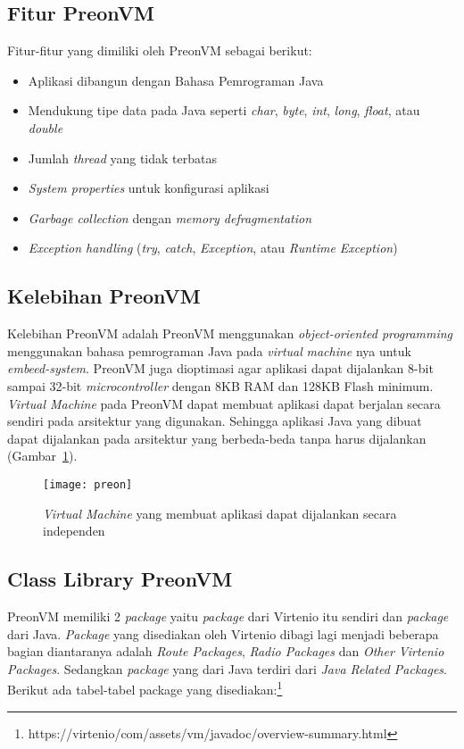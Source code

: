 \subsection{Fitur PreonVM}
Fitur-fitur yang dimiliki oleh PreonVM sebagai berikut:
\begin{itemize}
	\item Aplikasi dibangun dengan Bahasa Pemrograman Java
	\item Mendukung tipe data pada Java seperti \textit{char}, \textit{byte}, \textit{int}, \textit{long}, \textit{float}, atau \textit{double}
	\item Jumlah \textit{thread} yang tidak terbatas
	\item \textit{System properties} untuk konfigurasi aplikasi
	\item \textit{Garbage collection} dengan \textit{memory defragmentation}
	\item \textit{Exception handling} (\textit{try}, \textit{catch}, \textit{Exception}, atau \textit{Runtime Exception})
\end{itemize}

\subsection{Kelebihan PreonVM}
Kelebihan PreonVM adalah PreonVM menggunakan \textit{object-oriented programming} menggunakan bahasa pemrograman Java pada \textit{virtual} \textit{machine} nya untuk \textit{embeed-system}. PreonVM juga dioptimasi agar aplikasi dapat dijalankan 8-bit sampai 32-bit \textit{microcontroller} dengan 8KB RAM dan 128KB Flash minimum. \textit{Virtual Machine} pada PreonVM dapat membuat aplikasi dapat berjalan secara sendiri pada arsitektur yang digunakan. Sehingga aplikasi Java yang dibuat dapat dijalankan pada arsitektur yang berbeda-beda tanpa harus dijalankan (Gambar~\ref{fig:preon}).  

\begin{figure}[H] 
		\centering  
		\texttt{[image: preon]}  
		\caption[\textit{Virtual Machine} yang membuat aplikasi dapat dijalankan secara independen]{\textit{Virtual Machine} yang membuat aplikasi dapat dijalankan secara independen}
		\label{fig:preon} 
\end{figure}
	
\subsection{Class Library PreonVM}
PreonVM memiliki 2 \textit{package} yaitu \textit{package} dari Virtenio itu sendiri dan \textit{package} dari Java. \textit{Package} yang disediakan oleh Virtenio dibagi lagi menjadi beberapa bagian diantaranya adalah \textit{Route Packages}, \textit{Radio Packages} dan \textit{Other Virtenio Packages}. Sedangkan \textit{package} yang dari Java terdiri dari \textit{Java Related Packages}. Berikut ada tabel-tabel package yang disediakan:\footnote{https://virtenio/com/assets/vm/javadoc/overview-summary.html}

